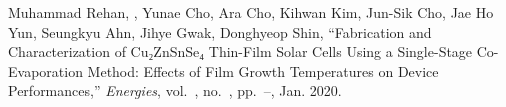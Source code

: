 \begin{pubSubsectionNum}
  \item Muhammad Rehan, \hyeonminjeon, Yunae Cho, Ara Cho, Kihwan Kim, Jun-Sik Cho, Jae Ho Yun, Seungkyu Ahn, Jihye Gwak, Donghyeop Shin, ``Fabrication and Characterization of Cu₂ZnSnSe₄ Thin-Film Solar Cells Using a Single-Stage Co-Evaporation Method: Effects of Film Growth Temperatures on Device Performances,'' \textit{Energies}, vol.~, no.~, pp.~--, Jan. 2020.
\end{pubSubsectionNum}
